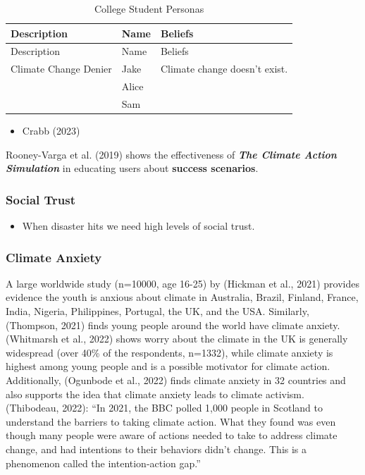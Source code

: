 \documentclass[
  letterpaper,
  DIV=11,
  numbers=noendperiod]{scrartcl}
\providecommand{\tightlist}{%
  \setlength{\itemsep}{0pt}\setlength{\parskip}{0pt}}\usepackage{longtable,booktabs,array}
\begin{document}
\begin{longtable}[]{@{}lll@{}}
\caption{College Student Personas}\tabularnewline
\toprule\noalign{}
Description & Name & Beliefs \\
\midrule\noalign{}
\endfirsthead
\toprule\noalign{}
Description & Name & Beliefs \\
\midrule\noalign{}
\endhead
\bottomrule\noalign{}
\endlastfoot
Climate Change Denier & Jake & Climate change doesn't exist. \\
& Alice & \\
& Sam & \\
\end{longtable}

\begin{itemize}
\tightlist
\item
  Crabb (2023)
\end{itemize}

Rooney-Varga et al. (2019) shows the effectiveness of \textbf{\emph{The
Climate Action Simulation}} in educating users about \textbf{success
scenarios}.

\subsubsection{Social Trust}\label{social-trust}

\begin{itemize}
\tightlist
\item
  When disaster hits we need high levels of social trust.
\end{itemize}

\subsubsection{Climate Anxiety}\label{climate-anxiety}

A large worldwide study (n=10000, age 16-25) by (Hickman et al., 2021)
provides evidence the youth is anxious about climate in Australia,
Brazil, Finland, France, India, Nigeria, Philippines, Portugal, the UK,
and the USA. Similarly, (Thompson, 2021) finds young people around the
world have climate anxiety. (Whitmarsh et al., 2022) shows worry about
the climate in the UK is generally widespread (over 40\% of the
respondents, n=1332), while climate anxiety is highest among young
people and is a possible motivator for climate action. Additionally,
(Ogunbode et al., 2022) finds climate anxiety in 32 countries and also
supports the idea that climate anxiety leads to climate activism.
(Thibodeau, 2022): ``In 2021, the BBC polled 1,000 people in Scotland to
understand the barriers to taking climate action. What they found was
even though many people were aware of actions needed to take to address
climate change, and had intentions to their behaviors didn't change.
This is a phenomenon called the intention-action gap.''
\end{document}
